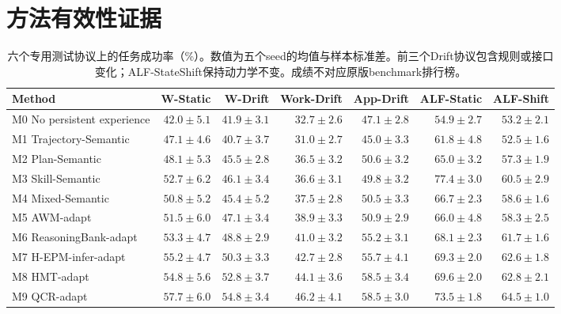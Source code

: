 \documentclass[sigconf,anonymous,review]{acmart}
\theoremstyle{zhplain}
\begin{document}
\section{方法有效性证据}
\label{sec:results}
\begin{table}[t]
\centering
\caption{六个专用测试协议上的任务成功率（\%）。数值为五个seed的均值与样本标准差。前三个Drift协议包含规则或接口变化；ALF-StateShift保持动力学不变。成绩不对应原版benchmark排行榜。}
\label{tab:main}
\small
\begin{tabular}{@{}lrrrrrr@{}}
\toprule
Method & W-Static & W-Drift & Work-Drift & App-Drift & ALF-Static & ALF-Shift \\
\midrule
M0 No persistent experience & \(42.0\!\pm\!5.1\) & \(41.9\!\pm\!3.1\) & \(32.7\!\pm\!2.6\) & \(47.1\!\pm\!2.8\) & \(54.9\!\pm\!2.7\) & \(53.2\!\pm\!2.1\) \\
M1 Trajectory-Semantic & \(47.1\!\pm\!4.6\) & \(40.7\!\pm\!3.7\) & \(31.0\!\pm\!2.7\) & \(45.0\!\pm\!3.3\) & \(61.8\!\pm\!4.8\) & \(52.5\!\pm\!1.6\) \\
M2 Plan-Semantic & \(48.1\!\pm\!5.3\) & \(45.5\!\pm\!2.8\) & \(36.5\!\pm\!3.2\) & \(50.6\!\pm\!3.2\) & \(65.0\!\pm\!3.2\) & \(57.3\!\pm\!1.9\) \\
M3 Skill-Semantic & \(52.7\!\pm\!6.2\) & \(46.1\!\pm\!3.4\) & \(36.6\!\pm\!3.1\) & \(49.8\!\pm\!3.2\) & \(77.4\!\pm\!3.0\) & \(60.5\!\pm\!2.9\) \\
M4 Mixed-Semantic & \(50.8\!\pm\!5.2\) & \(45.4\!\pm\!5.2\) & \(37.5\!\pm\!2.8\) & \(50.5\!\pm\!3.3\) & \(66.7\!\pm\!2.3\) & \(58.6\!\pm\!1.6\) \\
M5 AWM-adapt & \(51.5\!\pm\!6.0\) & \(47.1\!\pm\!3.4\) & \(38.9\!\pm\!3.3\) & \(50.9\!\pm\!2.9\) & \(66.0\!\pm\!4.8\) & \(58.3\!\pm\!2.5\) \\
M6 ReasoningBank-adapt & \(53.3\!\pm\!4.7\) & \(48.8\!\pm\!2.9\) & \(41.0\!\pm\!3.2\) & \(55.2\!\pm\!3.1\) & \(68.1\!\pm\!2.3\) & \(61.7\!\pm\!1.6\) \\
M7 H-EPM-infer-adapt & \(55.2\!\pm\!4.7\) & \(50.3\!\pm\!3.3\) & \(42.7\!\pm\!2.8\) & \(55.7\!\pm\!4.1\) & \(69.3\!\pm\!2.0\) & \(62.6\!\pm\!1.8\) \\
M8 HMT-adapt & \(54.8\!\pm\!5.6\) & \(52.8\!\pm\!3.7\) & \(44.1\!\pm\!3.6\) & \(58.5\!\pm\!3.4\) & \(69.6\!\pm\!2.0\) & \(62.8\!\pm\!2.1\) \\
M9 QCR-adapt & \(57.7\!\pm\!6.0\) & \(54.8\!\pm\!3.4\) & \(46.2\!\pm\!4.1\) & \(58.5\!\pm\!3.0\) & \(73.5\!\pm\!1.8\) & \(64.5\!\pm\!1.0\) \\

\end{tabular}
\end{table}
\end{document}
